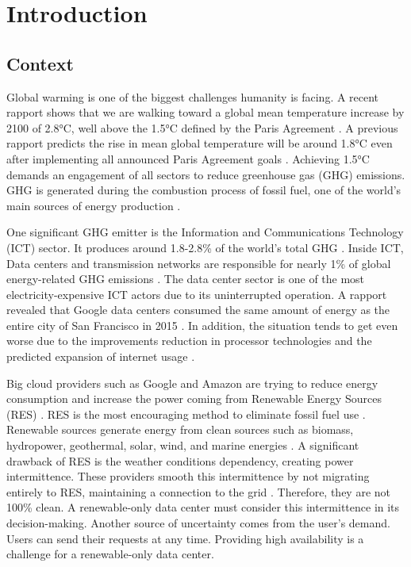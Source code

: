 \chapter{Introduction}
\label{cha:introduction}

\section{Context}

Global warming is one of the biggest challenges humanity is facing. A recent rapport shows that we are walking toward a global mean temperature increase by 2100 of 2.8°C, well above the 1.5°C defined by the Paris Agreement \cite{lee2023ar6}. A previous rapport predicts the rise in mean global temperature will be around 1.8°C even after implementing all announced Paris Agreement goals \cite{tracker2022projections}. Achieving 1.5°C demands an engagement of all sectors to reduce greenhouse gas (GHG) emissions. GHG is generated during the combustion process of fossil fuel, one of the world's main sources of energy production \cite{olabi2022renewable}.

One significant GHG emitter is the Information and Communications Technology (ICT) sector. It produces around 1.8-2.8\% of the world's total GHG \cite{freitag2021climate}. Inside ICT, Data centers and transmission networks are responsible for nearly 1\% of global energy-related GHG emissions \cite{centres2022data}. The data center sector is one of the most electricity-expensive ICT actors due to its uninterrupted operation. A rapport revealed that Google data centers consumed the same amount of energy as the entire city of San Francisco in 2015 \cite{khan2018exploiting}. In addition, the situation tends to get even worse due to the improvements reduction in processor technologies and the predicted expansion of internet usage \cite{cisco2020cisco, freitag2021climate}.

Big cloud providers such as Google and Amazon are trying to reduce energy consumption and increase the power coming from Renewable Energy Sources (RES) \cite{Masanet984}. RES is the most encouraging method to eliminate fossil
fuel use \cite{olabi2022renewable}. Renewable sources generate energy from clean sources such as biomass, hydropower, geothermal, solar, wind, and marine energies \cite{augustine2012renewable, panwar2011role, rostirolla2022survey, UNREnewable, gross2003progress}. A significant drawback of RES is the weather conditions dependency, creating power intermittence. These providers smooth this intermittence by not migrating entirely to RES, maintaining a connection to the grid \cite{rostirolla2022survey}. Therefore, they are not 100\% clean. A renewable-only data center must consider this intermittence in its decision-making. Another source of uncertainty comes from the user's demand. Users can send their requests at any time. Providing high availability is a challenge for a renewable-only data center.

